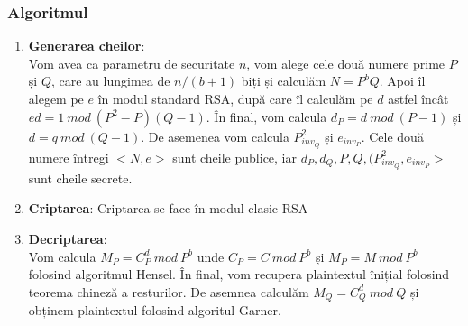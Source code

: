\documentclass[12pt, oneside]{book}
\begin{document}
		  \subsubsection{Algoritmul}
		  \begin{enumerate}
		  \item \textbf{Generarea cheilor}:\\
		  Vom avea ca parametru de securitate $n$, vom alege cele două numere prime $P$ și $Q$, care au lungimea de $n/(b+1)$ biți și calculăm $N=P^bQ$. Apoi îl alegem pe $e$ în modul standard RSA, după care îl calculăm pe $d$ astfel încât $ed=1 \ mod \ (P^2-P)(Q-1)$. În final, vom calcula $d_P= d \ mod \ (P-1)$ și $d=q \ mod \ (Q-1)$. De asemenea vom calcula $P_{inv_Q}^{2}$ și $e_{inv_P}$. Cele două numere întregi $<N,e>$ sunt cheile publice, iar $d_P,d_Q,P,Q,(P_{inv_Q}^{2},e_{inv_P}>$ sunt cheile secrete.
		  \item \textbf{Criptarea}:
		  Criptarea se face în modul clasic RSA
		  
		  \item \textbf{Decriptarea}: \\
		  Vom calcula $M_P = C_{P}^{d} \ mod \ P^b $ unde $C_P = C \ mod \ P^b$ și  $M_P = M \ mod \ P^b$ folosind algoritmul Hensel. În final, vom recupera plaintextul înițial folosind teorema chineză a resturilor. De asemnea calculăm $M_Q= C_{Q}^{d} \ mod \ Q$ și obținem plaintextul folosind algoritul Garner.
		  \end{enumerate}
		  
\end{document}
